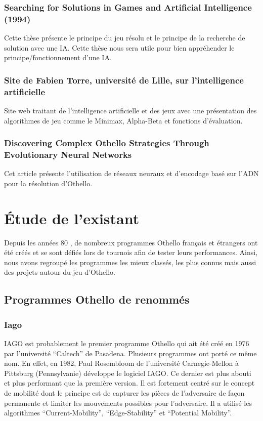 \documentclass[a4paper,12pt]{article}
\begin{document}
\subsubsection{Searching for Solutions in Games and Artificial Intelligence (1994)}
Cette thèse \cite{14} présente le principe du jeu résolu et le principe de la
recherche de solution avec une IA. Cette thèse nous sera utile pour
bien appréhender le principe/fonctionnement d'une IA. 


\subsubsection{Site de Fabien Torre, université de Lille, sur l'intelligence artificielle}
Site web \cite{2}  traitant de l'intelligence artificielle et des jeux avec une présentation des algorithmes de jeu comme le Minimax, Alpha-Beta et fonctions d'évaluation. 


\subsubsection{Discovering Complex Othello Strategies Through Evolutionary Neural Networks}
Cet article \cite{9} présente l'utilisation de réseaux neuraux et d'encodage basé sur l'ADN pour la résolution d'Othello.



\section{Étude de l'existant}

Depuis les années 80 \cite{antho} \cite{tour} \cite{otstory}, de nombreux programmes Othello français \cite{prog1} et
étrangers \cite{prog2} ont été créés et se sont défiés lors de tournois afin de
tester leurs performances. Ainsi, nous avons regroupé les programmes
les mieux classés, les plus connus mais aussi des projets autour du
jeu d'Othello.

\subsection{Programmes Othello de renommés}

\subsubsection{Iago}
IAGO \cite{iago} est probablement le premier programme Othello qui ait été créé en 1976 par l'université “Caltech” de Pasadena.
Plusieurs programmes ont porté ce même nom. En effet, en 1982, Paul
Rosembloom de l'université Carnegie-Mellon à Pittsburg (Pennsylvanie)
développe le logiciel IAGO. Ce dernier est plus abouti et plus
performant que la première version. Il est fortement centré sur le
concept de mobilité dont le principe est de capturer les pièces de l'adversaire de façon permanente et limiter les mouvements possibles pour l'adversaire.
Il a utilisé les algorithmes “Current-Mobility”, “Edge-Stability” et “Potential Mobility”.
\end{document}
